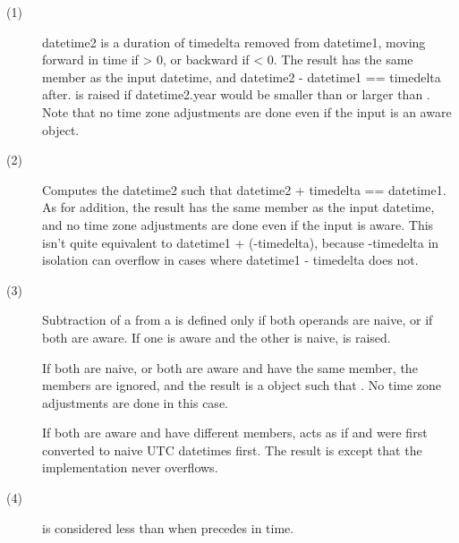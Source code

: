 \begin{description}

\item[(1)]

    datetime2 is a duration of timedelta removed from datetime1, moving
    forward in time if  > 0, or backward if
     < 0.  The result has the same  member
    as the input datetime, and datetime2 - datetime1 == timedelta after.
     is raised if datetime2.year would be
    smaller than  or larger than .
    Note that no time zone adjustments are done even if the input is an
    aware object.

\item[(2)]
    Computes the datetime2 such that datetime2 + timedelta == datetime1.
    As for addition, the result has the same  member
    as the input datetime, and no time zone adjustments are done even
    if the input is aware.
    This isn't quite equivalent to datetime1 + (-timedelta), because
    -timedelta in isolation can overflow in cases where
    datetime1 - timedelta does not.

\item[(3)]
    Subtraction of a  from a
     is defined only if both
    operands are naive, or if both are aware.  If one is aware and the
    other is naive,  is raised.

    If both are naive, or both are aware and have the same 
    member, the  members are ignored, and the result is
    a  object  such that
    .  No time zone
    adjustments are done in this case.

    If both are aware and have different  members,
     acts as if  and  were first converted to
    naive UTC datetimes first.  The result is
    except that the implementation never overflows.

\item[(4)]

 is considered less than 
when  precedes  in time.


\end{description}

